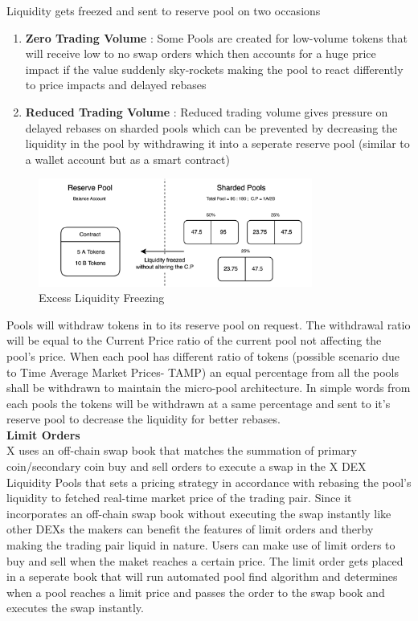 \documentclass[letterpaper,11pt]{article}
\begin{document}
Liquidity gets freezed and sent to reserve pool on two occasions
\begin{enumerate}[wide, labelwidth=!, labelindent=0pt]
\item \textbf{Zero Trading Volume} : Some Pools are created for low-volume tokens that will receive low to no swap orders which then accounts for a huge price impact if the value suddenly sky-rockets making the pool to react differently to price impacts and delayed rebases
\item \textbf{Reduced Trading Volume} : Reduced trading volume gives pressure on delayed rebases on sharded pools which can be prevented by decreasing the liquidity in the pool by withdrawing it into a seperate reserve pool (similar to a wallet account but as a smart contract) 
\end{enumerate}

\begin{figure}[H]
\begin{center}
\includegraphics[width=9cm]{reserve-pool-2}
\caption{Excess Liquidity Freezing}
\end{center}
\end{figure}

Pools will withdraw tokens in to its reserve pool on request. The withdrawal ratio will be equal to the Current Price ratio of the current pool not affecting the pool's price. When each pool has different ratio of tokens (possible scenario due to Time Average Market Prices- TAMP) an equal percentage from all the pools shall be withdrawn to maintain the micro-pool architecture. In simple words from each pools the tokens will be withdrawn at a same percentage and sent to it's reserve pool to decrease the liquidity for better rebases.\\


\textbf{Limit Orders}\\

X uses an off-chain swap book that matches the summation of primary coin/secondary coin buy and sell orders to execute a swap in the X DEX Liquidity Pools that sets a pricing strategy in accordance with rebasing the pool's liquidity to fetched real-time market price of the trading pair. Since it incorporates an off-chain swap book without executing the swap instantly like other DEXs the makers can benefit the features of limit orders and therby making the trading pair liquid in nature. Users can make use of limit orders to buy and sell when the maket reaches a certain price. The limit order gets placed in a seperate book that will run automated pool find algorithm and determines when a pool reaches a limit price and passes the order to the swap book and executes the swap instantly.\\
\end{document}
